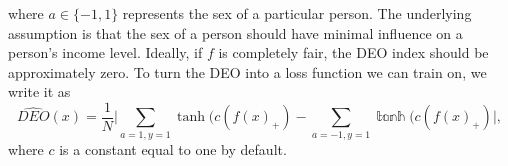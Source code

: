 \documentclass{article}
\newcommand{\set}[1]{\{#1\}}
\renewcommand{\|}{\biggr|}
\begin{document}
    where $a\in \set{-1,1}$ represents the sex of a particular person. The underlying assumption is that the sex of a person should have minimal influence on a person's income level. Ideally, if $f$ is completely fair, the DEO index should be approximately zero. To turn the DEO into a loss function we can train on, we write it as 
    \begin{equation*}
        \widehat{DEO}(x) = \frac{1}{N}\| \sum_{a = 1, y= 1}\tanh(c (f(x)_+) - \sum_{a =  -1, y= 1}\mathbb \tanh(c (f(x)_+)\|,
    \end{equation*}
    where $c$ is a constant equal to one by default.
\end{document}
